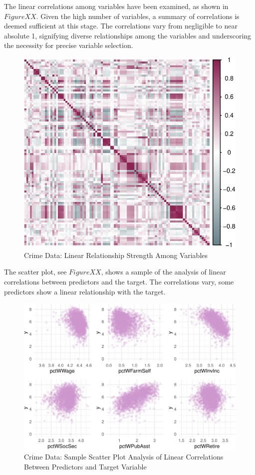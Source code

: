 \documentclass[
  11pt,
]{article}
\begin{document}
The linear correlations among variables have been examined, as shown in
\(Figure XX\). Given the high number of variables, a summary of
correlations is deemed sufficient at this stage. The correlations vary
from negligible to near absolute 1, signifying diverse relationships
among the variables and underscoring the necessity for precise variable
selection.

\begin{figure}[H]

{\centering \includegraphics[width=0.70\linewidth]{dissertation_files/figure-latex/Correlations Plot-1} 

}

\caption{Crime Data: Linear Relationship Strength Among Variables}\label{fig:Correlations Plot}
\end{figure}

The scatter plot, see \(Figure XX\), shows a sample of the analysis of
linear correlations between predictors and the target. The correlations
vary, some predictors show a linear relationship with the target.

\begin{figure}[H]

{\centering \includegraphics[width=0.75\linewidth]{dissertation_files/figure-latex/Scatter Plot-1} 

}

\caption{Crime Data: Sample Scatter Plot Analysis of Linear Correlations Between Predictors and Target Variable}\label{fig:Scatter Plot}
\end{figure}
\end{document}
